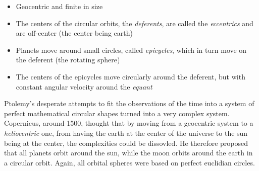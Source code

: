 \begin{figure}[h!]
	\centering
\end{figure}

\begin{itemize}
	\item Geocentric and finite in size
	\item The centers of the circular orbits, the \emph{deferents}, are called the \emph{eccentrics} and are off-center (the center being earth)
	\item Planets move around small circles, called \emph{epicycles}, which in turn move on the deferent (the rotating sphere)
	\item The centers of the epicycles move circularly around the deferent, but with constant angular velocity around the \emph{equant}
\end{itemize}


Ptolemy's desperate attempts to fit the observations of the time into a system of perfect mathematical circular shapes turned into a very complex system. Copernicus, around 1500, thought that by moving from a geocentric system to a \emph{heliocentric} one, from having the earth at the center of the universe to the sun being at the center, the complexities could be dissovled. He therefore proposed that all planets orbit around the sun, while the moon orbits around the earth in a circular orbit. Again, all orbital spheres were based on perfect euclidian circles.

